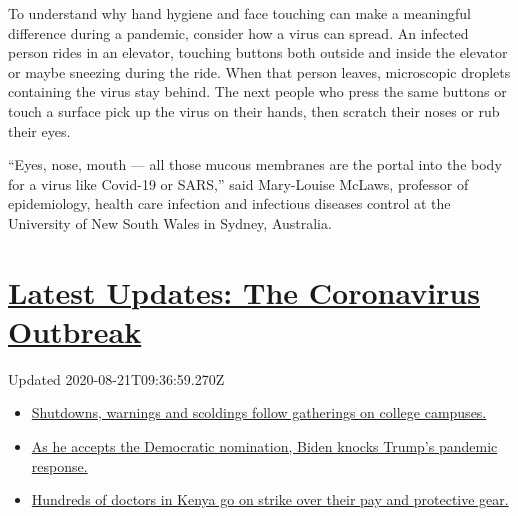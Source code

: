 To understand why hand hygiene and face touching can make a meaningful
difference during a pandemic, consider how a virus can spread. An
infected person rides in an elevator, touching buttons both outside and
inside the elevator or maybe sneezing during the ride. When that person
leaves, microscopic droplets containing the virus stay behind. The next
people who press the same buttons or touch a surface pick up the virus
on their hands, then scratch their noses or rub their eyes.

``Eyes, nose, mouth --- all those mucous membranes are the portal into
the body for a virus like Covid-19 or SARS,'' said Mary-Louise McLaws,
professor of epidemiology, health care infection and infectious diseases
control at the University of New South Wales in Sydney, Australia.

\hypertarget{latest-updates-the-coronavirus-outbreak}{%
\section{\texorpdfstring{\href{https://www.nytimes3xbfgragh.onion/2020/08/21/world/covid-19-coronavirus.html?action=click\&pgtype=Article\&state=default\&region=MAIN_CONTENT_1\&context=storylines_live_updates}{Latest
Updates: The Coronavirus
Outbreak}}{Latest Updates: The Coronavirus Outbreak}}\label{latest-updates-the-coronavirus-outbreak}}

Updated 2020-08-21T09:36:59.270Z

\begin{itemize}
\tightlist
\item
  \href{https://www.nytimes3xbfgragh.onion/2020/08/21/world/covid-19-coronavirus.html?action=click\&pgtype=Article\&state=default\&region=MAIN_CONTENT_1\&context=storylines_live_updates\#link-4690b6aa}{Shutdowns,
  warnings and scoldings follow gatherings on college campuses.}
\item
  \href{https://www.nytimes3xbfgragh.onion/2020/08/21/world/covid-19-coronavirus.html?action=click\&pgtype=Article\&state=default\&region=MAIN_CONTENT_1\&context=storylines_live_updates\#link-324af071}{As
  he accepts the Democratic nomination, Biden knocks Trump's pandemic
  response.}
\item
  \href{https://www.nytimes3xbfgragh.onion/2020/08/21/world/covid-19-coronavirus.html?action=click\&pgtype=Article\&state=default\&region=MAIN_CONTENT_1\&context=storylines_live_updates\#link-35890b73}{Hundreds
  of doctors in Kenya go on strike over their pay and protective gear.}
\end{itemize}


